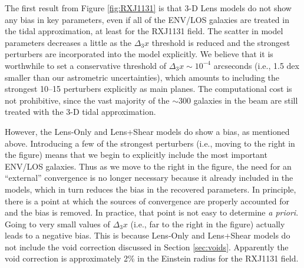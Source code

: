 \documentclass{emulateapj}
\begin{document}
The first result from Figure \ref{fig:RXJ1131} is that 3-D Lens models do not show any bias in key parameters, even if all of the ENV/LOS galaxies are treated in the tidal approximation, at least for the RXJ1131 field. The scatter in model parameters decreases a little as the $\Delta_3 x$ threshold is reduced and the strongest perturbers are incorporated into the model explicitly.  We believe that it is worthwhile to set a conservative threshold of $\Delta_3 x \sim 10^{-4}$ arcseconds (i.e., 1.5 dex smaller than our astrometric uncertainties), which amounts to including the strongest 10--15 perturbers explicitly as main planes.  The computational cost is not prohibitive, since the vast majority of the $\sim 300$ galaxies in the beam are still treated with the 3-D tidal approximation.

However, the Lens-Only and Lens+Shear models do show a bias, as mentioned above. Introducing a few of the strongest perturbers (i.e., moving to the right in the figure) means that we begin to explicitly include the most important ENV/LOS galaxies. Thus as we move to the right in the figure, the need for an ``external'' convergence is no longer necessary because it already included in the models, which in turn reduces the bias in the recovered parameters.  In principle, there is a point at which the sources of convergence are properly accounted for and the bias is removed.  In practice, that point is not easy to determine \emph{a priori}.  Going to very small values of $\Delta_3 x$ (i.e., far to the right in the figure) actually leads to a negative bias.  This is because Lens-Only and Lens+Shear models do not include the void correction discussed in Section \ref{sec:voids}.  Apparently the void correction is approximately 2\% in the Einstein radius for the RXJ1131 field.
\end{document}
